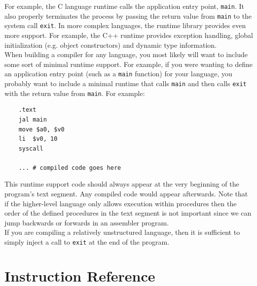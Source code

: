 \documentclass[12pt]{article}
\begin{document}
For example, the C language runtime calls the application entry point,
     \texttt{main}. It also properly terminates the process by passing the
     return value from \texttt{main} to the system call \texttt{exit}. In more
     complex languages, the runtime library provides even more support. For
     example, the C++ runtime provides exception handling, global initialization
     (e.g. object constructors) and dynamic type information.\\

When building a compiler for any language, you most likely will want to include
     some sort of minimal runtime support. For example, if you were wanting to
     define an application entry point (such as a \texttt{main} function) for
     your language, you probably want to include a minimal runtime that calls
     \texttt{main} and then calls \texttt{exit} with the return value from
     \texttt{main}. For example:\\

\begin{lstlisting}
    .text
    jal main
    move $a0, $v0
    li  $v0, 10
    syscall

    ... # compiled code goes here
\end{lstlisting}

This runtime support code should always appear at the very beginning of the
     program's text segment. Any compiled code would appear afterwards. Note
     that if the higher-level language only allows execution within procedures
     then the order of the defined procedures in the text segment is not
     important since we can jump backwards or forwards in an assembler
     program.\\

If you are compiling a relatively unstructured language, then it is sufficient
     to simply inject a call to \texttt{exit} at the end of the program.

\newpage
\section{Instruction Reference}
\label{sec:iref}
\end{document}

